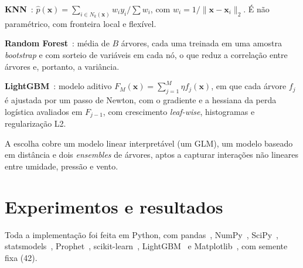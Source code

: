 \documentclass[conference,a4paper]{IEEEtran}
\begin{document}
\textbf{KNN}~\cite{cover1967knn,dudani1976distance}: $\hat p(\mathbf x) = \sum_{i\in N_k(\mathbf x)} w_i y_i/\sum w_i$,
com $w_i = 1/\lVert\mathbf x-\mathbf x_i\rVert_2$. É não paramétrico, com fronteira local e flexível.

\textbf{Random Forest}~\cite{breiman2001rf}: média de $B$ árvores, cada uma treinada em uma
amostra \textit{bootstrap} e com sorteio de variáveis em cada nó, o que reduz a correlação
entre árvores e, portanto, a variância.

\textbf{LightGBM}~\cite{ke2017lightgbm,friedman2001gbm,chen2016xgboost}: modelo aditivo
$F_M(\mathbf x) = \sum_{j=1}^{M}\eta f_j(\mathbf x)$, em que cada árvore $f_j$ é ajustada por um
passo de Newton, com o gradiente e a hessiana da perda logística avaliados em $F_{j-1}$, com crescimento \textit{leaf-wise}, histogramas e
regularização L2.

A escolha cobre um modelo linear interpretável (um GLM), um modelo
baseado em distância e dois \textit{ensembles} de árvores, aptos a capturar interações não
lineares entre umidade, pressão e vento.

\section{Experimentos e resultados}\label{sec:exp}

Toda a implementação foi feita em Python, com pandas~\cite{mckinney2010pandas},
NumPy~\cite{harris2020numpy}, SciPy~\cite{virtanen2020scipy},
statsmodels~\cite{seabold2010statsmodels}, Prophet~\cite{taylor2018prophet},
scikit-learn~\cite{pedregosa2011sklearn}, LightGBM~\cite{ke2017lightgbm} e
Matplotlib~\cite{hunter2007matplotlib}, com semente fixa (42).
\end{document}
